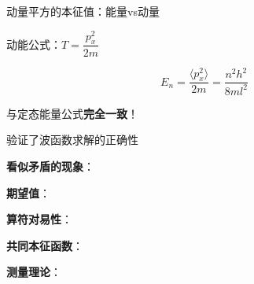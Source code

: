 \documentclass[aspectratio=169, 10pt]{beamer}
\begin{document}
\begin{frame}{动量平方的本征值：能量vs动量}
{    
    \begin{iqbitemize}
    \item 动能公式：$T = \dfrac{p_x^2}{2m}$
    \end{iqbitemize}
      \[
        E_n = \dfrac{\langle p_x^2 \rangle}{2m} = \dfrac{n^2h^2}{8ml^2}
      \]
    \begin{iqbitemize}
    \item 与定态能量公式\textbf{完全一致}！
    \item 验证了波函数求解的正确性
    \end{iqbitemize}
  }{
    \begin{iqbitemize}
    \item \textbf{看似矛盾的现象}：
    \item \textbf{期望值}：
    \end{iqbitemize}
    \iqbsmallsep

    \begin{iqbitemize}
    \item \textbf{算符对易性}：
    \item \textbf{共同本征函数}：
    \item \textbf{测量理论}：
    \end{iqbitemize}
    \iqbsmallsep

  }
\end{frame}
\end{document}
